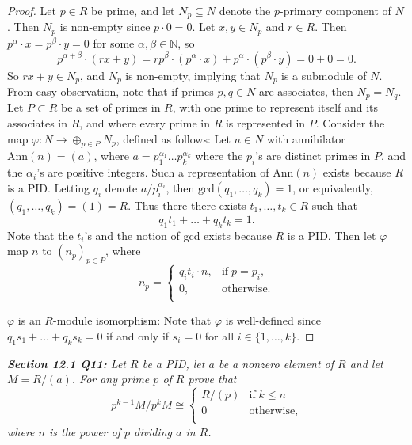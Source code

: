 \documentclass{article}
\begin{document}
  \begin{proof}
    Let $p\in R$ be prime, and let $N_p\subseteq N$ denote the $p$-primary
    component of $N$. Then $N_p$ is non-empty since $p\cdot0=0$. Let
    $x,y\in N_p$ and $r\in R$. Then $p^\alpha\cdot x=p^\beta\cdot y=0$ for
    some $\alpha,\beta\in\mathbb{N}$, so
    \[p^{\alpha+\beta}\cdot(rx+y) =rp^\beta\cdot(p^\alpha\cdot
    x)+p^\alpha\cdot(p^\beta\cdot y) =0+0=0.\]
    So $rx+y\in N_p$, and $N_p$ is non-empty, implying that $N_p$ is a
    submodule of $N$. \\

    From easy observation, note that if primes $p,q\in N$ are associates,
    then $N_p=N_q$. Let $P\subset R$ be a set of primes in $R$, with one
    prime to represent itself and its associates in $R$, and where every
    prime in $R$ is represented in $P$. Consider the map
    $\varphi:N\rightarrow \oplus_{p\in P}N_p$, defined as follows: Let
    $n\in N$ with annihilator $\text{Ann}(n)=(a)$, where
    $a=p_1^{\alpha_1}\ldots p_k^{\alpha_k}$ where the $p_i$'s are distinct
    primes in $P$, and the $\alpha_i$'s are positive integers. Such a
    representation of $\text{Ann}(n)$ exists because $R$ is a PID. Letting
    $q_i$ denote $a/p_i^{\alpha_i}$, then $\text{gcd}(q_1,\ldots,q_k)=1$,
    or equivalently, $(q_1,\ldots,q_k)=(1)=R$. Thus there there exists
    $t_1,\ldots,t_k\in R$ such that \[q_1t_1+\ldots+q_kt_k=1.\] Note that
    the $t_i$'s and the notion of gcd exists because $R$ is a PID. Then let
    $\varphi$ map $n$ to $(n_p)_{p\in P}$, where
    \begin{equation*}
      n_p=
      \begin{cases}
        q_it_i\cdot n, &\text{if}\; p=p_i,\\
        0, &\text{otherwise}. \\
      \end{cases}
    \end{equation*}

    $\varphi$ is an $R$-module isomorphism: Note that $\varphi$ is
    well-defined since $q_1s_1+\ldots+q_ks_k=0$ if and only if $s_i=0$ for
    all $i\in\{1,\ldots,k\}$.
  \end{proof}

\it \textbf{Section 12.1 Q11:} Let $R$ be a PID, let $a$ be a nonzero
  element of $R$ and let $M=R/(a)$. For any prime $p$ of $R$ prove that
  \begin{equation*}
    p^{k-1}M/p^kM\cong
    \begin{cases}
      R/(p) &\text{if}\; k\leq n\\
      0 &\text{otherwise},\\
    \end{cases}
  \end{equation*}
  where $n$ is the power of $p$ dividing $a$ in $R$.
\end{document}
